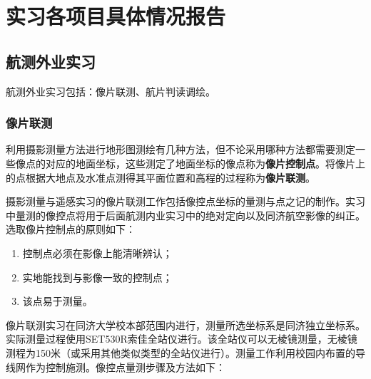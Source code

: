 \chapter{实习各项目具体情况报告}

\section{航测外业实习}

航测外业实习包括：像片联测、航片判读调绘。

\subsection{像片联测}

\label{sub:waiye}
利用摄影测量方法进行地形图测绘有几种方法，但不论采用哪种方法都需要测定一些像点的对应的地面坐标，这些测定了地面坐标的像点称为\textbf{像片控制点}。将像片上的点根据大地点及水准点测得其平面位置和高程的过程称为\textbf{像片联测}。

摄影测量与遥感实习的像片联测工作包括像控点坐标的量测与点之记的制作。实习中量测的像控点将用于后面航测内业实习中的绝对定向以及同济航空影像的纠正。选取像片控制点的原则如下：

\begin{enumerate}[label=\alph*.]
    \item 控制点必须在影像上能清晰辨认；
    \item 实地能找到与影像一致的控制点；
    \item 该点易于测量。
\end{enumerate}

像片联测实习在同济大学校本部范围内进行，测量所选坐标系是同济独立坐标系。实际测量过程使用SET530R索佳全站仪进行。该全站仪可以无棱镜测量，无棱镜测程为150米（或采用其他类似类型的全站仪进行）。测量工作利用校园内布置的导线网作为控制施测。像控点量测步骤及方法如下：

